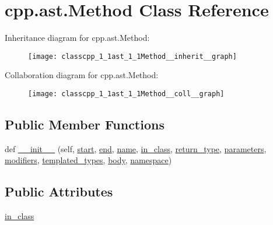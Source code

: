\hypertarget{classcpp_1_1ast_1_1Method}{}\section{cpp.\+ast.\+Method Class Reference}
\label{classcpp_1_1ast_1_1Method}


Inheritance diagram for cpp.\+ast.\+Method\+:\nopagebreak
\begin{figure}[H]
\begin{center}
\leavevmode
\texttt{[image: classcpp\_1\_1ast\_1\_1Method\_\_inherit\_\_graph]}
\end{center}
\end{figure}


Collaboration diagram for cpp.\+ast.\+Method\+:\nopagebreak
\begin{figure}[H]
\begin{center}
\leavevmode
\texttt{[image: classcpp\_1\_1ast\_1\_1Method\_\_coll\_\_graph]}
\end{center}
\end{figure}
\subsection*{Public Member Functions}
\begin{DoxyCompactItemize}
\item 
def \hyperlink{classcpp_1_1ast_1_1Method_aa3cbdc9c4b7e92b15fa6acea0dbf2322}{\+\_\+\+\_\+init\+\_\+\+\_\+} (self, \hyperlink{classcpp_1_1ast_1_1Node_a7b2aa97e6a049bb1a93aea48c48f1f44}{start}, \hyperlink{classcpp_1_1ast_1_1Node_a3c5e5246ccf619df28eca02e29d69647}{end}, \hyperlink{classcpp_1_1ast_1_1__GenericDeclaration_af774f4729dfd78d0538a6782fe8514c1}{name}, \hyperlink{classcpp_1_1ast_1_1Method_aa67244c3673afed43398b5d3e3fa6c1c}{in\+\_\+class}, \hyperlink{classcpp_1_1ast_1_1Function_af750fd788d7ab33163ee066534780212}{return\+\_\+type}, \hyperlink{classcpp_1_1ast_1_1Function_a0e61ef47af9cf2fd4402dbd8cab631ef}{parameters}, \hyperlink{classcpp_1_1ast_1_1Function_ad30eed435f1ff9ff34ade9cc0d7be121}{modifiers}, \hyperlink{classcpp_1_1ast_1_1Function_a57bb03218bade3240137a0d91c467cb6}{templated\+\_\+types}, \hyperlink{classcpp_1_1ast_1_1Function_a8e25e5016b23b38e32acf2df529c0650}{body}, \hyperlink{classcpp_1_1ast_1_1__GenericDeclaration_a8aee3f11b37449d54b42a78e0a689f46}{namespace})
\end{DoxyCompactItemize}
\subsection*{Public Attributes}
\begin{DoxyCompactItemize}
\item 
\hyperlink{classcpp_1_1ast_1_1Method_aa67244c3673afed43398b5d3e3fa6c1c}{in\+\_\+class}
\end{DoxyCompactItemize}


